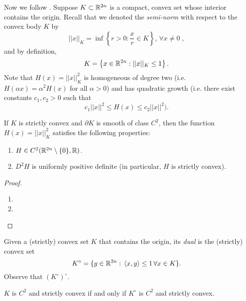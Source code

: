 \documentclass[../capacities_main.tex]{subfiles}
\begin{document}
	Now we follow \cite{hofer-zhender}. Suppose $K \subset {\mathbb R}^{2n}$ is a compact, convex set whose interior contains the origin.  Recall that we denoted the \emph{semi-norm} with respect to the convex body $K$ by
	\begin{equation*} \label{eq: def_of_semi_norm_of_convex_body}
	||x||_K = \inf\left\{ r> 0 : \frac{x}{r} \in K\right\},\, \forall x \neq 0 \;,
	\end{equation*}
	and by definition,
	\begin{equation*}
	K = \left\{ x \in {\mathbb R}^{2n} : ||x||_K \leq 1\right\}.
	\end{equation*}
	Note that $H(x) = ||x||_K^2$ is homogeneous of degree two (i.e. $H(\alpha x) = \alpha^2H(x) $ for all $\alpha >0$) and has quadratic growth (i.e. there exist constants $c_1,c_2 >0$ such that 
	\begin{equation*}
	c_1||x||^2 \leq H(x) \leq c_2 ||x||^2).
	\end{equation*}
	
	\begin{Proposition}\label{function H}
		If $K$ is strictly convex and $\partial K$ is smooth of class $C^2$, then the function $H(x) = ||x||_K^2$ satisfies the following properties:
		\begin{enumerate}
			\item $H\in C^2({\mathbb R}^{2n}\setminus \{0\},{\mathbb R})$.
			\item $D^2H$ is uniformly positive definite (in particular, $H$ is strictly convex).
		\end{enumerate}
	\end{Proposition}
	
	\begin{proof}
		
		\begin{enumerate}
			\item 
			\item 
		\end{enumerate}
	\end{proof}
	
	Given a (strictly) convex set $K$ that contains the origin, its \emph{dual} is the (strictly) convex set
	\begin{equation*}
	K^{\circ} = \{ y\in {\mathbb R}^{2n} :\, \langle x,y \rangle \leq 1\, \forall x \in K \}.
	\end{equation*}
	Observe that $(K^{\circ})^{\circ}$.
	\begin{Proposition}
		$K$ is $C^2$ and strictly convex if and only if $K^{\circ}$ is $C^2$ and strictly convex.
	\end{Proposition}
	
\end{document}
